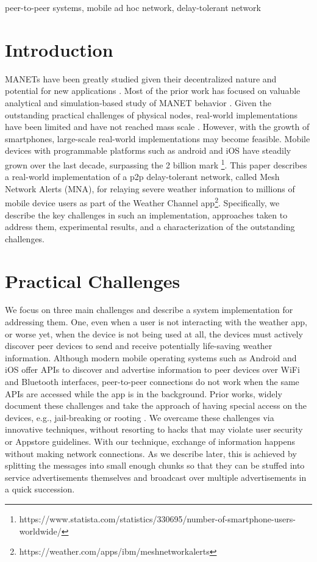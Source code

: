 \documentclass[conference]{IEEEtran}
\begin{document}
\begin{IEEEkeywords}
peer-to-peer systems, mobile ad hoc network, delay-tolerant network
\end{IEEEkeywords}

\section{Introduction}
MANETs have been greatly studied given their decentralized nature and potential for new applications \cite{loo-manet-2011,perkins-ad-hoc-2001}. Most of the prior work has focused on valuable analytical and simulation-based study of MANET behavior \cite{zhang-topology-manet-2015,marti-misbehavior-manet-2000,mauve-pos-routing-manet-2001}. Given the outstanding practical challenges of physical nodes, real-world implementations have been limited and have not reached mass scale \cite{kiess-manet-impl-2007}. However, with the growth of smartphones, large-scale real-world implementations may become feasible. Mobile devices with programmable platforms such as android and iOS have steadily grown over the last decade, surpassing the 2 billion mark \footnote{https://www.statista.com/statistics/330695/number-of-smartphone-users-worldwide/}. This paper describes a real-world implementation of a p2p delay-tolerant network, called Mesh Network Alerts (MNA), for relaying severe weather information to millions of mobile device users as part of the Weather Channel app\footnote{https://weather.com/apps/ibm/meshnetworkalerts}. Specifically, we describe the key challenges in such an implementation, approaches taken to address them, experimental results, and a characterization of the outstanding challenges.

\section{Practical Challenges}
We focus on three main challenges and describe a system implementation for addressing them. One, even when a user is not interacting with the weather app, or worse yet, when the device is not being used at all, the devices must actively discover peer devices to send and receive potentially life-saving weather information. Although modern mobile operating systems such as Android and iOS offer APIs to discover and advertise information to peer devices over WiFi and Bluetooth interfaces, peer-to-peer connections do not work when the same APIs are accessed while the app is in the background. Prior works, widely document these challenges and take the approach of having special access on the devices, e.g., jail-breaking or rooting \cite{}. We overcame these challenges via innovative techniques, without resorting to hacks that may violate user security or Appstore guidelines. With our technique, exchange of information happens without making network connections. As we describe later, this is achieved by splitting the messages into small enough chunks so that they can be stuffed into service advertisements themselves and broadcast over multiple advertisements in a quick succession.
\end{document}
